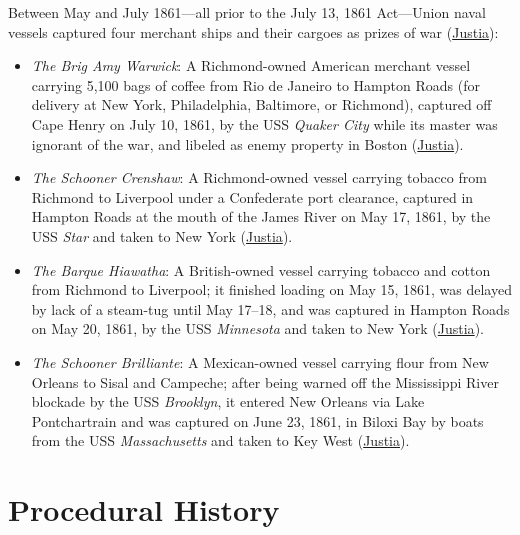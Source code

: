 \documentclass[12pt]{article}
\begin{document}
Between May and July 1861---all prior to the July 13, 1861 Act---Union naval vessels captured four merchant ships and their cargoes as prizes of war (\href{https://supreme.justia.com/cases/federal/us/67/635/}{Justia}):
\begin{itemize}
\item \textit{The Brig Amy Warwick}: A Richmond-owned American merchant vessel carrying 5,100 bags of coffee from Rio de Janeiro to Hampton Roads (for delivery at New York, Philadelphia, Baltimore, or Richmond), captured off Cape Henry on July 10, 1861, by the USS \textit{Quaker City} while its master was ignorant of the war, and libeled as enemy property in Boston (\href{https://supreme.justia.com/cases/federal/us/67/635/}{Justia}).
\item \textit{The Schooner Crenshaw}: A Richmond-owned vessel carrying tobacco from Richmond to Liverpool under a Confederate port clearance, captured in Hampton Roads at the mouth of the James River on May 17, 1861, by the USS \textit{Star} and taken to New York (\href{https://supreme.justia.com/cases/federal/us/67/635/}{Justia}).
\item \textit{The Barque Hiawatha}: A British-owned vessel carrying tobacco and cotton from Richmond to Liverpool; it finished loading on May 15, 1861, was delayed by lack of a steam-tug until May 17--18, and was captured in Hampton Roads on May 20, 1861, by the USS \textit{Minnesota} and taken to New York (\href{https://supreme.justia.com/cases/federal/us/67/635/}{Justia}).
\item \textit{The Schooner Brilliante}: A Mexican-owned vessel carrying flour from New Orleans to Sisal and Campeche; after being warned off the Mississippi River blockade by the USS \textit{Brooklyn}, it entered New Orleans via Lake Pontchartrain and was captured on June 23, 1861, in Biloxi Bay by boats from the USS \textit{Massachusetts} and taken to Key West (\href{https://supreme.justia.com/cases/federal/us/67/635/}{Justia}).
\end{itemize}

\section{Procedural History}
\end{document}
